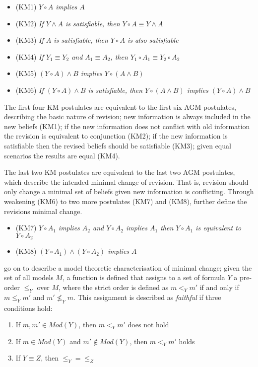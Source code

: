 \begin{itemize}
  \item (KM1) \textit{ $Y \circ A$  implies $A$}
  \item (KM2) \textit{ If $Y \wedge A$  is satisfiable, then $Y \circ A \equiv Y \wedge A$}
  \item (KM3) \textit{ If $A$ is satisfiable, then $Y \circ A$  is also satisfiable}
  \item (KM4) \textit{ If $Y_1 \equiv Y_2$ and $A_1 \equiv A_2$, then $Y_1 \circ A_1 \equiv Y_2 \circ A_2$}
  \item (KM5) \textit{ $(Y \circ A) \wedge B$  implies $Y \circ (A \wedge B)$}
  \item (KM6) \textit{ If $(Y \circ A) \wedge B$ is satisfiable, then $Y \circ (A \wedge B)$ implies $(Y \circ A) \wedge B$}
\end{itemize} 

The first four KM postulates are equivalent to the first six AGM postulates, describing the basic nature of revision;
new information is always included in the new beliefs (KM1); if the new information does not conflict with old information the revision is equivalent to conjunction (KM2);
if the new information is satisfiable then the revised beliefs should be satisfiable (KM3); given equal scenarios the results are equal (KM4).

The last two KM postulates are equivalent to the last two AGM postulates, which describe the intended minimal change of revision.
That is, revision should only change a minimal set of beliefs given new information is conflicting.
Through weakening (KM6) to two more postulates (KM7) and (KM8), \cite{katsuno1991propositional} further define the revisions minimal change.

\begin{itemize}
  \item (KM7) \textit{ $Y \circ A_1$  implies $A_2$ and $Y \circ A_2$ implies $A_1$ then $Y \circ A_1$ is equivalent to $Y \circ A_2$}
  \item (KM8) \textit{ $(Y \circ A_1) \wedge (Y \circ A_2)$ implies $A$}
\end{itemize}

\cite{katsuno1991propositional} go on to describe a model theoretic characterisation of minimal change; 
given the set of all models $M$, a function is defined that assigns to a set of formula $Y$ a pre-order $\leq_{Y}$ over $M$,
where the strict order is defined as $m <_Y m'$ if and only if $m \leq_Y m'$ and $m' \not \leq_Y m$. 
This assignment is described as \textit{faithful} if three conditions hold:
\begin{enumerate}
  \item If $m,m' \in Mod(Y)$, then $m <_Y m'$ does not hold
  \item If $m \in Mod(Y)$ and $m' \not\in Mod(Y)$, then $m <_Y m'$ holds
  \item If $Y \equiv Z$, then $\leq_Y = \leq_Z$  
\end{enumerate}

